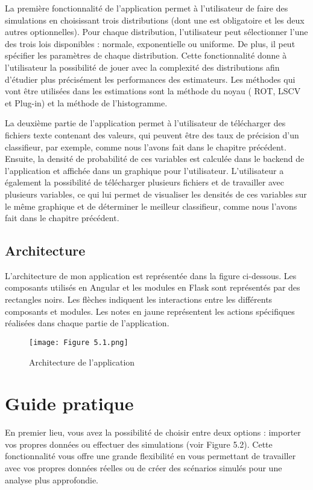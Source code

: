 La première fonctionnalité de l'application permet à l'utilisateur de faire des simulations en choisissant trois distributions (dont une est obligatoire et les deux autres optionnelles). Pour chaque distribution, l'utilisateur peut sélectionner l'une des trois lois disponibles : normale, exponentielle ou uniforme. De plus, il peut spécifier les paramètres de chaque distribution. Cette fonctionnalité donne à l'utilisateur la possibilité de jouer avec la complexité des distributions afin d'étudier plus précisément les performances des estimateurs. Les méthodes qui vont être utilisées dans les estimations sont la méthode du noyau ( ROT, LSCV et Plug-in) et la méthode de l'histogramme.

La deuxième partie de l'application permet à l'utilisateur de télécharger des fichiers texte contenant des valeurs, qui peuvent être des taux de précision d'un classifieur, par exemple, comme nous l'avons fait dans le chapitre précédent. Ensuite, la densité de probabilité de ces variables est calculée dans le backend de l'application et affichée dans un graphique pour l'utilisateur. L'utilisateur a également la possibilité de télécharger plusieurs fichiers et de travailler avec plusieurs variables, ce qui lui permet de visualiser les densités de ces variables sur le même graphique et de déterminer le meilleur classifieur, comme nous l'avons fait dans le chapitre précédent.

\subsection{Architecture}
    L'architecture de mon application est représentée dans la figure ci-dessous. Les composants utilisés en Angular et les modules en Flask sont représentés par des rectangles noirs. Les flèches indiquent les interactions entre les différents composants et modules. Les notes en jaune représentent les actions spécifiques réalisées dans chaque partie de l'application.
    
\begin{figure}[!h]
  \centering
  \texttt{[image: Figure 5.1.png]}
  \caption{Architecture de l'application}
  \label{fig:Architecture de l'application}
\end{figure}
\clearpage

\section{Guide pratique}
En premier lieu, vous avez la possibilité de choisir entre deux options : importer vos propres données ou effectuer des simulations (voir Figure 5.2). Cette fonctionnalité vous offre une grande flexibilité en vous permettant de travailler avec vos propres données réelles ou de créer des scénarios simulés pour une analyse plus approfondie.


